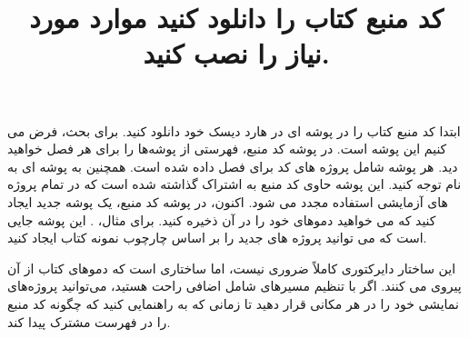 \title{
    \Large
    \textbf{کد منبع کتاب را دانلود کنید}
}

{  \large
ابتدا کد منبع کتاب را در پوشه ای در هارد دیسک خود دانلود کنید.
برای بحث، فرض می کنیم این پوشه  است.
در پوشه کد منبع، فهرستی از پوشه‌ها را برای هر فصل خواهید دید. هر پوشه شامل پروژه های کد برای فصل داده شده است.
همچنین به پوشه ای به نام  توجه کنید. این پوشه حاوی کد منبع به اشتراک گذاشته شده است که در تمام پروژه های آزمایشی استفاده مجدد می شود.
اکنون، در پوشه کد منبع، یک پوشه جدید ایجاد کنید که می خواهید دموهای خود را در آن ذخیره کنید. برای مثال، . این پوشه جایی است که می توانید پروژه های جدید را بر اساس چارچوب نمونه کتاب ایجاد کنید.

این ساختار دایرکتوری کاملاً ضروری نیست، اما ساختاری است که دموهای کتاب از آن پیروی می کنند. اگر با تنظیم مسیرهای شامل اضافی راحت هستید، می‌توانید پروژه‌های نمایشی خود را در هر مکانی قرار دهید تا زمانی که به  راهنمایی کنید که چگونه کد منبع را در فهرست مشترک پیدا کند.
} \\[25pt]

\title{
    \Large
    \textbf{موارد مورد نیاز  را نصب کنید.}
}

